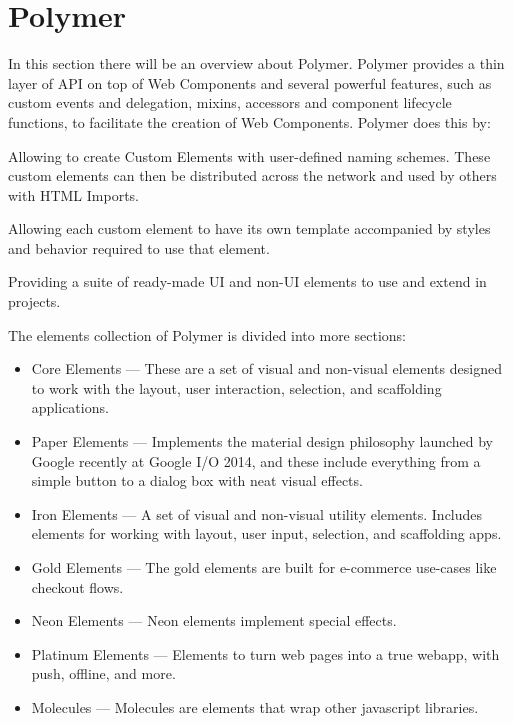 \section{Polymer}
\label{sec:TCH_polymer}

In this section there will be an overview about Polymer. Polymer provides a thin layer of API on top of Web Components and several powerful features, such as custom events and delegation, mixins, accessors and component lifecycle functions, to facilitate the creation of Web Components. Polymer does this by:

Allowing to create Custom Elements with user-defined naming schemes. These custom elements can then be distributed across the network and used by others with HTML Imports.

Allowing each custom element to have its own template accompanied by styles and behavior required to use that element.

Providing a suite of ready-made UI and non-UI elements to use and extend in projects.

The elements collection of Polymer is divided into more sections:

\begin{itemize}

\item Core Elements — These are a set of visual and non-visual elements designed to work with the layout, user interaction, selection, and scaffolding applications.
\item Paper Elements — Implements the material design philosophy launched by Google recently at Google I/O 2014, and these include everything from a simple button to a dialog box with neat visual effects.
\item Iron Elements — A set of visual and non-visual utility elements. Includes elements for working with layout, user input, selection, and scaffolding apps.
\item Gold Elements — The gold elements are built for e-commerce use-cases like checkout flows.
\item Neon Elements — Neon elements implement special effects.
\item Platinum Elements — Elements to turn web pages into a true webapp, with push, offline, and more.
\item Molecules — Molecules are elements that wrap other javascript libraries.
\end{itemize}



